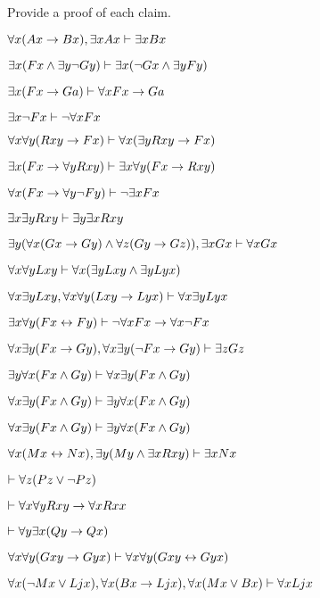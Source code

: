 \problempart
\label{pr.someFOLproofs}
Provide a proof of each claim.
\begin{earg}

\item $\forall x(Ax\rightarrow Bx), \exists x Ax \vdash \exists x Bx$
\item $\exists x(Fx \wedge \exists y\neg Gy) \vdash \exists x(\neg Gx \wedge \exists yFy)$
\item  $\exists x(Fx\rightarrow Ga) \vdash \forall xFx\rightarrow Ga$
\item  $\exists x \neg Fx \vdash \neg \forall xFx$
\item  $\forall x \forall y(Rxy \rightarrow Fx) \vdash \forall x(\exists yRxy \rightarrow Fx)$ 
\item $\exists x(Fx \rightarrow \forall yRxy) \vdash \exists x \forall y(Fx \rightarrow Rxy)$
\item $\forall x(Fx\rightarrow \forall y\neg Fy) \vdash \neg \exists xFx$
\item $\exists x\exists yRxy \vdash \exists y \exists xRxy$
\item  $\exists y(\forall x(Gx\rightarrow Gy)\wedge \forall z(Gy\rightarrow Gz)), \exists xGx \vdash \forall xGx$
\item $\forall x\forall yLxy \vdash \forall x(\exists yLxy \wedge \exists yLyx)$
\item $\forall x\exists yLxy, \forall x \forall y(Lxy \rightarrow Lyx) \vdash \forall x\exists yLyx$
\item $\exists x\forall y (Fx \leftrightarrow Fy) \vdash \neg \forall xFx \rightarrow \forall x\neg Fx$
\item $\forall x \exists y(Fx \rightarrow Gy), \forall x\exists y(\neg Fx \rightarrow Gy) \vdash \exists zGz$
\item $ \exists y\forall x(Fx \wedge Gy) \vdash \forall x \exists y(Fx \wedge Gy)$
\item $\forall x \exists y(Fx \wedge Gy) \vdash \exists y\forall x(Fx \wedge Gy)$
\item $\forall x \exists y(Fx \wedge Gy) \vdash \exists y\forall x(Fx \wedge Gy)$
\item $\forall x(Mx \leftrightarrow Nx), \exists y(My\wedge\exists x Rxy)\vdash \exists x Nx$
\item $\vdash\forall z (Pz \vee \neg Pz)$
\item $\vdash\forall x \forall yRxy\rightarrow \forall xRxx$
\item $\vdash\forall y \exists x (Qy \rightarrow Qx)$
\item $\forall x \forall y (Gxy \rightarrow Gyx) \vdash \forall x\forall y (Gxy \leftrightarrow Gyx)$
\item $\forall x(\neg Mx \vee Ljx), \forall x(Bx\rightarrow Ljx), \forall x(Mx\vee Bx)\vdash \forall xLjx$
\end{earg}


